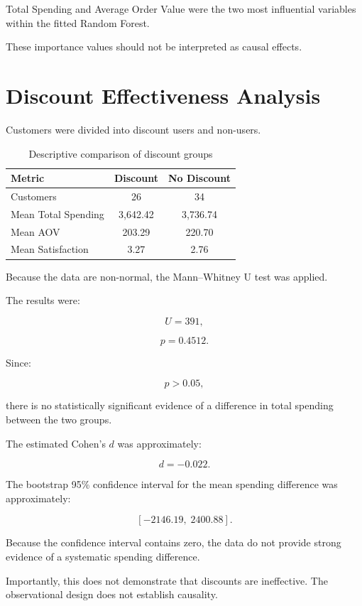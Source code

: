 \documentclass[11pt,a4paper]{article}
\begin{document}
Total Spending and Average Order Value were the two most influential variables within the fitted Random Forest.

These importance values should not be interpreted as causal effects.


\section{Discount Effectiveness Analysis}

Customers were divided into discount users and non-users.

\begin{table}[H]
\centering
\caption{Descriptive comparison of discount groups}
\label{tab:discount}
\begin{tabular}{lcc}
\toprule
\textbf{Metric} & \textbf{Discount} & \textbf{No Discount}\\
\midrule
Customers & 26 & 34\\
Mean Total Spending & 3,642.42 & 3,736.74\\
Mean AOV & 203.29 & 220.70\\
Mean Satisfaction & 3.27 & 2.76\\
\bottomrule
\end{tabular}
\end{table}

Because the data are non-normal, the Mann--Whitney U test was applied.

The results were:

\[
U=391,
\]

\[
p=0.4512.
\]

Since:

\[
p>0.05,
\]

there is no statistically significant evidence of a difference in total spending between the two groups.

The estimated Cohen's $d$ was approximately:

\[
d=-0.022.
\]

The bootstrap 95\% confidence interval for the mean spending difference was approximately:

\[
[-2146.19,\;2400.88].
\]

Because the confidence interval contains zero, the data do not provide strong evidence of a systematic spending difference.

Importantly, this does not demonstrate that discounts are ineffective. The observational design does not establish causality.
\end{document}
